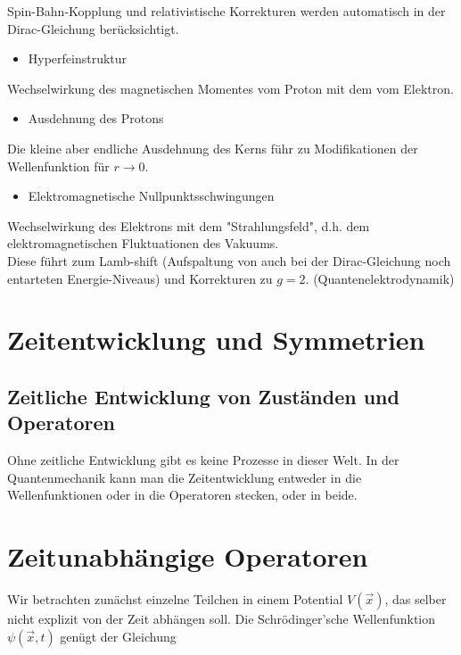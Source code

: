 \documentclass[10pt, letterpaper]{article}
\begin{document}
Spin-Bahn-Kopplung und relativistische Korrekturen werden automatisch in der Dirac-Gleichung berücksichtigt.

\begin{itemize}
  \item Hyperfeinstruktur
\end{itemize}

Wechselwirkung des magnetischen Momentes vom Proton mit dem vom Elektron.

\begin{itemize}
  \item Ausdehnung des Protons
\end{itemize}

Die kleine aber endliche Ausdehnung des Kerns führ zu Modifikationen der Wellenfunktion für $r \rightarrow 0$.

\begin{itemize}
  \item Elektromagnetische Nullpunktsschwingungen
\end{itemize}

Wechselwirkung des Elektrons mit dem "Strahlungsfeld", d.h. dem elektromagnetischen Fluktuationen des Vakuums.\\
Diese führt zum Lamb-shift (Aufspaltung von auch bei der Dirac-Gleichung noch entarteten Energie-Niveaus) und Korrekturen zu $g=2$. (Quantenelektrodynamik)

\pagebreak


\section{Zeitentwicklung und Symmetrien}



\subsection*{Zeitliche Entwicklung von Zuständen und Operatoren}
Ohne zeitliche Entwicklung gibt es keine Prozesse in dieser Welt. In der Quantenmechanik kann man die Zeitentwicklung entweder in die Wellenfunktionen oder in die Operatoren stecken, oder in beide.

\section*{Zeitunabhängige Operatoren}
Wir betrachten zunächst einzelne Teilchen in einem Potential $V(\vec{x})$, das selber nicht explizit von der Zeit abhängen soll. Die Schrödinger'sche Wellenfunktion $\psi(\vec{x}, t)$ genügt der Gleichung
\end{document}
